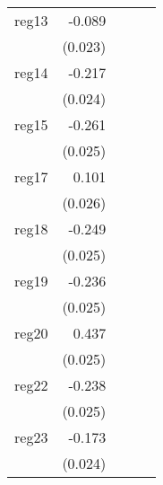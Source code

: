 {\begin{longtable}{l*{4}{D{.}{.}{-1}}}
\addlinespace
reg13       &      -0.089\sym{***}&                     &                     &                     \\
            &     (0.023)         &                     &                     &                     \\
\addlinespace
reg14       &      -0.217\sym{***}&                     &                     &                     \\
            &     (0.024)         &                     &                     &                     \\
\addlinespace
reg15       &      -0.261\sym{***}&                     &                     &                     \\
            &     (0.025)         &                     &                     &                     \\
\addlinespace
reg17       &       0.101\sym{***}&                     &                     &                     \\
            &     (0.026)         &                     &                     &                     \\
\addlinespace
reg18       &      -0.249\sym{***}&                     &                     &                     \\
            &     (0.025)         &                     &                     &                     \\
\addlinespace
reg19       &      -0.236\sym{***}&                     &                     &                     \\
            &     (0.025)         &                     &                     &                     \\
\addlinespace
reg20       &       0.437\sym{***}&                     &                     &                     \\
            &     (0.025)         &                     &                     &                     \\
\addlinespace
reg22       &      -0.238\sym{***}&                     &                     &                     \\
            &     (0.025)         &                     &                     &                     \\
\addlinespace
reg23       &      -0.173\sym{***}&                     &                     &                     \\
            &     (0.024)         &                     &                     &                     \\

\end{longtable}}
